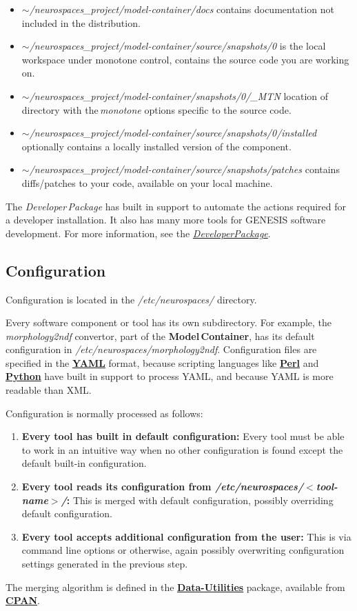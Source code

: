 \documentclass[12pt]{article}
\begin{document}
\begin{itemize}
\item[]{\it $\sim$/neurospaces\_project/model-container/docs} contains documentation not included in the distribution. 
\item[]{\it $\sim$/neurospaces\_project/model-container/source/snapshots/0} is the local workspace under monotone control, contains the source code you are working on. 
\item[]{\it $\sim$/neurospaces\_project/model-container/snapshots/0/\_MTN} location of directory with the\,{\it monotone} options specific to the source code.
\item[]{\it $\sim$/neurospaces\_project/model-container/source/snapshots/0/installed} optionally contains a locally installed version of the component.
\item[]{\it $\sim$/neurospaces\_project/model-container/source/snapshots/patches} contains diffs/patches to your code, available on your local machine.
\end{itemize}
The {\it Developer\,Package} has built in support to automate the actions required for a developer installation. It also has many more tools for GENESIS software development. For more information, see the \href{../developer-package/developer-package.tex}{\it DeveloperPackage}.

\subsection*{Configuration}

Configuration is located in the {\it /etc/neurospaces/} directory.

Every software component or tool has its own subdirectory. For example, the {\it morphology2ndf} convertor, part of the {\bf Model\,Container}, has its default configuration in {\it /etc/neurospaces/morphology2ndf}. Configuration files are specified in the \href{http://www.yaml.org/}{\bf YAML} format, because scripting languages like \href{http://www.perl.org/}{\bf Perl} and \href{http://www.python.org/}{\bf Python} have built in support to process YAML, and because YAML is more readable than XML.

Configuration is normally processed as follows:
\begin{enumerate}
\item {\bf Every tool has built in default configuration:} Every tool must be able to work in an intuitive way when no other configuration is found except the default built-in configuration.
\item {\bf Every tool reads its configuration from {\it /etc/neurospaces/$<$tool-name$>$/}:} This is merged with default configuration, possibly overriding default configuration.
\item {\bf Every tool accepts additional configuration from the user:} This is via command line options or otherwise, again possibly overwriting configuration settings generated in the previous step. 
\end{enumerate}
The merging algorithm is defined in the
\href{http://search.cpan.org/dist/Data-Utilities/}{\bf Data-Utilities}
package, available from \href{http://www.cpan.org/}{\bf CPAN}.
\end{document}
